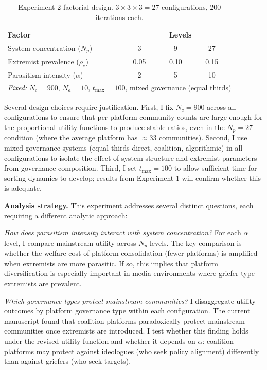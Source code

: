 \documentclass{article}
\begin{document}
\begin{table}[h]
\centering
\begin{tabular}{lcccccc}
\hline
\textbf{Factor} & \multicolumn{6}{c}{\textbf{Levels}} \\
\hline \hline
System concentration ($N_p$) & 3 & & 9 & & 27 & \\
Extremist prevalence ($\rho_e$) & 0.05 & & 0.10 & & 0.15 & \\
Parasitism intensity ($\alpha$) & 2 & & 5 & & 10 & \\
\hline
\multicolumn{7}{l}{\textit{Fixed:} $N_c = 900$, $N_a = 10$, $t_{\max} = 100$, mixed governance (equal thirds)} \\
\hline
\end{tabular}
\caption{Experiment 2 factorial design. $3 \times 3 \times 3 = 27$ configurations, 200 iterations each.}
\label{tab:exp2_config}
\end{table}

Several design choices require justification. First, I fix $N_c = 900$ across all configurations to ensure that per-platform community counts are large enough for the proportional utility functions to produce stable ratios, even in the $N_p = 27$ condition (where the average platform has $\approx 33$ communities). Second, I use mixed-governance systems (equal thirds direct, coalition, algorithmic) in all configurations to isolate the effect of system structure and extremist parameters from governance composition. Third, I set $t_{\max} = 100$ to allow sufficient time for sorting dynamics to develop; results from Experiment 1 will confirm whether this is adequate.

\textbf{Analysis strategy.} This experiment addresses several distinct questions, each requiring a different analytic approach:

\textit{How does parasitism intensity interact with system concentration?} For each $\alpha$ level, I compare mainstream utility across $N_p$ levels. The key comparison is whether the welfare cost of platform consolidation (fewer platforms) is amplified when extremists are more parasitic. If so, this implies that platform diversification is especially important in media environments where griefer-type extremists are prevalent.

\textit{Which governance types protect mainstream communities?} I disaggregate utility outcomes by platform governance type within each configuration. The current manuscript found that coalition platforms paradoxically protect mainstream communities once extremists are introduced. I test whether this finding holds under the revised utility function and whether it depends on $\alpha$: coalition platforms may protect against ideologues (who seek policy alignment) differently than against griefers (who seek targets).
\end{document}
